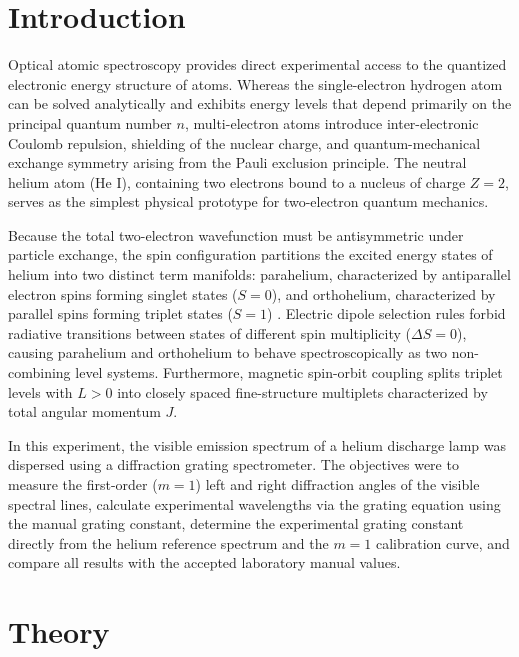 \documentclass[journal]{IEEEtran}
\begin{document}
\section{Introduction}
Optical atomic spectroscopy provides direct experimental access to the quantized electronic energy structure of atoms. Whereas the single-electron hydrogen atom can be solved analytically and exhibits energy levels that depend primarily on the principal quantum number $n$, multi-electron atoms introduce inter-electronic Coulomb repulsion, shielding of the nuclear charge, and quantum-mechanical exchange symmetry arising from the Pauli exclusion principle. The neutral helium atom (He I), containing two electrons bound to a nucleus of charge $Z = 2$, serves as the simplest physical prototype for two-electron quantum mechanics.

Because the total two-electron wavefunction must be antisymmetric under particle exchange, the spin configuration partitions the excited energy states of helium into two distinct term manifolds: parahelium, characterized by antiparallel electron spins forming singlet states ($S = 0$), and orthohelium, characterized by parallel spins forming triplet states ($S = 1$) \cite{lab_manual, haken_wolf}. Electric dipole selection rules forbid radiative transitions between states of different spin multiplicity ($\Delta S = 0$), causing parahelium and orthohelium to behave spectroscopically as two non-combining level systems. Furthermore, magnetic spin-orbit coupling splits triplet levels with $L > 0$ into closely spaced fine-structure multiplets characterized by total angular momentum $J$.

In this experiment, the visible emission spectrum of a helium discharge lamp was dispersed using a diffraction grating spectrometer. The objectives were to measure the first-order ($m = 1$) left and right diffraction angles of the visible spectral lines, calculate experimental wavelengths via the grating equation using the manual grating constant, determine the experimental grating constant directly from the helium reference spectrum and the $m = 1$ calibration curve, and compare all results with the accepted laboratory manual values.

\section{Theory}
\end{document}
